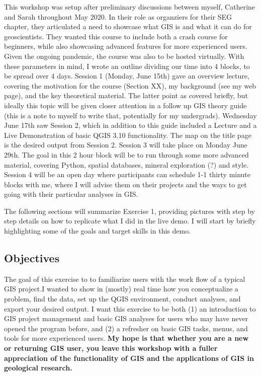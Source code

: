 \documentclass{article}
\begin{document}
This workshop was setup after preliminary discussions between myself, Catherine and Sarah throughout May 2020. In their role as organziers for their SEG chapter, they articulated a need to showcase what GIS is and what it can do for geoscientists. They wanted this course to include both a crash course for beginners, while also showcasing advanced features for more experienced users. Given the ongoing pandemic, the course was also to be hosted virtually. With these parameters in mind, I wrote an outline dividing our time into 4 blocks, to be spread over 4 days. Session 1 (Monday, June 15th) gave an overview lecture, covering the motivation for the course (Section XX), my background (see my web page), and the key theoretical material. The latter point as covered briefly, but ideally this topic will be given closer attention in a follow up GIS theory guide (this is a note to myself to write that, potentially for my undergrads). Wednesday June 17th saw Session 2, which in addition to this guide included a Lecture and a Live Demonstration of basic QGIS 3.10 functionality. The map on the title page is the desired output from Session 2. Session 3 will take place on Monday June 29th. The goal in this 2 hour block will be to run through some more advanced material, covering Python, spatial databases, mineral exploration (?) and style. Session 4 will be an open day where participants can schedule 1-1 thirty minute blocks with me, where I will advise them on their projects and the ways to get going with their particular analyses in GIS. 

The following sections will summarize Exercise 1, providing pictures with step by step details on how to replicate what I did in the live demo. I will start by briefly highlighting some of the goals and target skills in this demo. 

\subsection{Objectives}

The goal of this exercise to to familiarize users with the work flow of a typical GIS project.I wanted to show in (mostly) real time how you conceptualize a problem, find the data, set up the QGIS environment, conduct analyses, and export your desired output. I want this exercise to be both (1) an introduction to GIS project management and basic GIS analyses for users who may have never opened the program before, and (2) a refresher on basic GIS tasks, menus, and tools for more experienced users. \textbf{My hope is that whether you are a new or returning GIS user, you leave this workshop with a fuller appreciation of the functionality of GIS and the applications of GIS in geological research.} 
\end{document}
